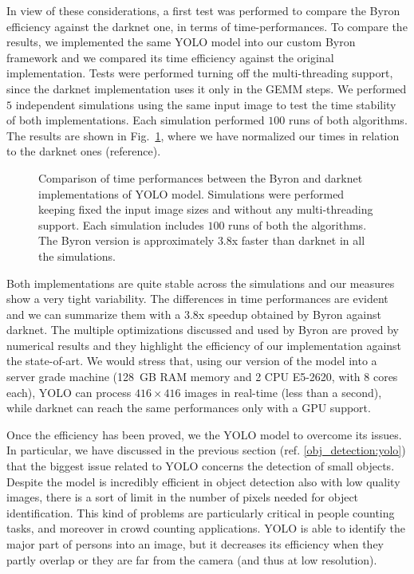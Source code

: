 \documentclass{standalone}
\begin{document}
In view of these considerations, a first test was performed to compare the \textsf{Byron} efficiency against the \textsf{darknet} one, in terms of time-performances.
To compare the results, we implemented the same YOLO model into our custom \textsf{Byron} framework and we compared its time efficiency against the original implementation.
Tests were performed turning off the multi-threading support, since the \textsf{darknet} implementation uses it only in the \textsf{GEMM} steps.
We performed $5$ independent simulations using the same input image to test the time stability of both implementations.
Each simulation performed $100$ runs of both algorithms.
The results are shown in Fig.~\ref{fig:yolo_time}, where we have normalized our times in relation to the \textsf{darknet} ones (reference).

\begin{figure}[htbp]
\centering
\def\svgwidth{0.85\textwidth}

\caption{Comparison of time performances between the \textsf{Byron} and \textsf{darknet} implementations of YOLO model.
Simulations were performed keeping fixed the input image sizes and without any multi-threading support.
Each simulation includes $100$ runs of both the algorithms.
The \textsf{Byron} version is approximately $3.8$x faster than \textsf{darknet} in all the simulations.
}
\label{fig:yolo_time}
\end{figure}

Both implementations are quite stable across the simulations and our measures show a very tight variability.
The differences in time performances are evident and we can summarize them with a $3.8$x speedup obtained by \textsf{Byron} against \textsf{darknet}.
The multiple optimizations discussed and used by \textsf{Byron} are proved by numerical results and they highlight the efficiency of our implementation against the state-of-art.
We would stress that, using our version of the model into a server grade machine (128~GB RAM memory and 2 CPU E5-2620, with 8 cores each), YOLO can process $416\times416$ images in real-time (less than a second), while \textsf{darknet} can reach the same performances only with a GPU support.

Once the efficiency has been proved, we  the YOLO model to overcome its issues.
In particular, we have discussed in the previous section (ref. \ref{obj_detection:yolo}) that the biggest issue related to YOLO concerns the detection of small objects.
Despite the model is incredibly efficient in object detection also with low quality images, there is a sort of limit in the number of pixels needed for object identification.
This kind of problems are particularly critical in people counting tasks, and moreover in crowd counting applications.
YOLO is able to identify the major part of persons into an image, but it decreases its efficiency when they partly overlap or they are far from the camera (and thus at low resolution).
\end{document}
